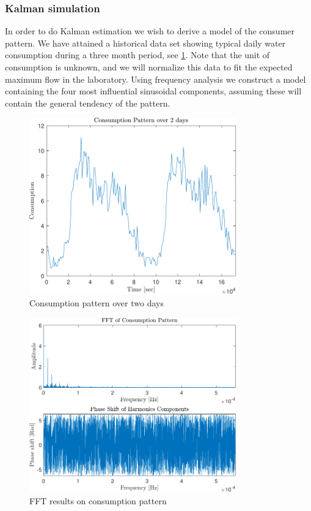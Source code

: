 \subsubsection{Kalman simulation}
In order to do Kalman estimation we wish to derive a model of the consumer pattern. We have attained a historical data set showing typical daily water consumption during a three month period, see \cref{fig:Consumptionpattern}. Note that the unit of consumption is unknown, and we will normalize this data to fit the expected maximum flow in the laboratory.  Using frequency analysis we construct a model containing the four most influential sinusoidal components, assuming these will contain the general tendency of the pattern.

\begin{figure}[h!]
	\centering
	\includegraphics[width=0.8\textwidth]{Pictures/ConsumptionPattern.pdf}
	
	\caption{Consumption pattern over two days}
	\label{fig:Consumptionpattern}
\end{figure}

\begin{figure}[h!]
	\centering
	\includegraphics[width=0.8\textwidth]{Pictures/FFT.pdf}
	
	\caption{FFT results on consumption pattern}
	\label{fig:FFT}
\end{figure}


